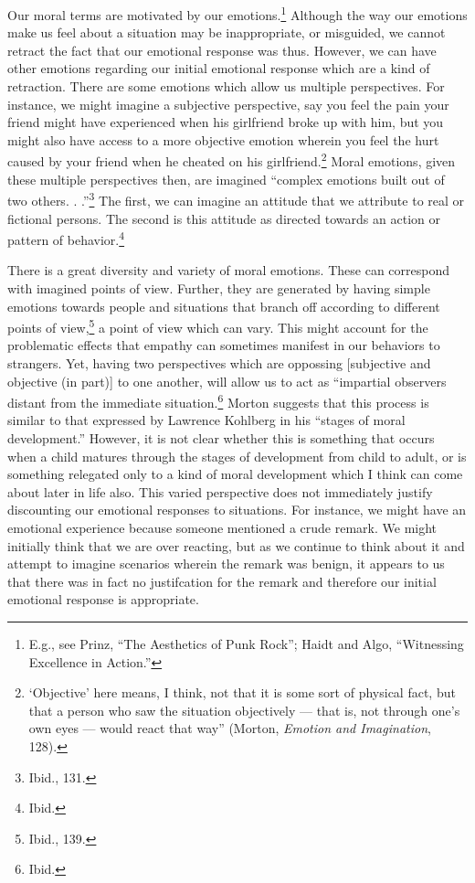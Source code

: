 \documentclass[phdthesis,12pt,final,a4paper]{wuthesis}
\theoremstyle{definition}
\theoremstyle{definition}
\theoremstyle{definition}
\theoremstyle{definition}
\theoremstyle{remark}
\begin{document}
Our moral terms are motivated by our emotions.\footnote{E.g., see Prinz, {``The {Aesthetics} of {Punk Rock}''}; Haidt and Algo, {``Witnessing {Excellence} in {Action}.''}} Although the way our emotions make us feel about a situation may be inappropriate, or misguided, we cannot retract the fact that our emotional response was thus. However, we can have other emotions regarding our initial emotional response which are a kind of retraction. There are some emotions which allow us multiple perspectives. For instance, we might imagine a subjective perspective, say you feel the pain your friend might have experienced when his girlfriend broke up with him, but you might also have access to a more objective emotion wherein you feel the hurt caused by your friend when he cheated on his girlfriend.\footnote{`Objective' here means, I think, not that it is some sort of physical fact, but that a person who saw the situation objectively --- that is, not through one's own eyes --- would react that way'' (Morton, \emph{Emotion and {Imagination}}, 128).} Moral emotions, given these multiple perspectives then, are imagined ``complex emotions built out of two others. . .''\footnote{Ibid., 131.} The first, we can imagine an attitude that we attribute to real or fictional persons. The second is this attitude as directed towards an action or pattern of behavior.\footnote{Ibid.}

There is a great diversity and variety of moral emotions. These can correspond with imagined points of view. Further, they are generated by having simple emotions towards people and situations that branch off according to different points of view,\footnote{Ibid., 139.} a point of view which can vary. This might account for the problematic effects that empathy can sometimes manifest in our behaviors to strangers. Yet, having two perspectives which are oppossing {[}subjective and objective (in part){]} to one another, will allow us to act as ``impartial observers distant from the immediate situation.\footnote{Ibid.} Morton suggests that this process is similar to that expressed by Lawrence Kohlberg in his ``stages of moral development.'' However, it is not clear whether this is something that occurs when a child matures through the stages of development from child to adult, or is something relegated only to a kind of moral development which I think can come about later in life also. This varied perspective does not immediately justify discounting our emotional responses to situations. For instance, we might have an emotional experience because someone mentioned a crude remark. We might initially think that we are over reacting, but as we continue to think about it and attempt to imagine scenarios wherein the remark was benign, it appears to us that there was in fact no justifcation for the remark and therefore our initial emotional response is appropriate.
\end{document}
